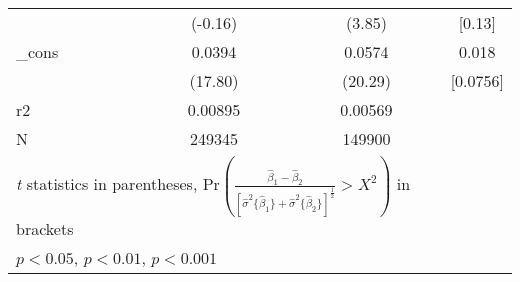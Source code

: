 \begin{table}[htbp]
\begin{tabular}{l*{3}{c}}
            &     (-0.16)         &      (3.85)         &    [0.13]         \\
[1em]
\_cons      &      0.0394\sym{***}&      0.0574\sym{***}&   0.018\\
            &     (17.80)         &     (20.29)         &    [0.0756]         \\
\hline
r2          &     0.00895         &     0.00569\\
N           &      249345         &      149900\\
\hline\hline
\multicolumn{3}{l}{\footnotesize \textit{t} statistics in parentheses, $\text{Pr}(\frac{\hat{\beta}_1 - \hat{\beta}_2}{[\hat{\sigma}^2\{\hat{\beta}_1\} + \hat{\sigma}^2\{\hat{\beta}_2\}]^\frac{1}{2}} > X^2)$ in brackets}\\
\multicolumn{3}{l}{\footnotesize \sym{*} \(p<0.05\), \sym{**} \(p<0.01\), \sym{***} \(p<0.001\)}\\
\end{tabular}
\end{table}
